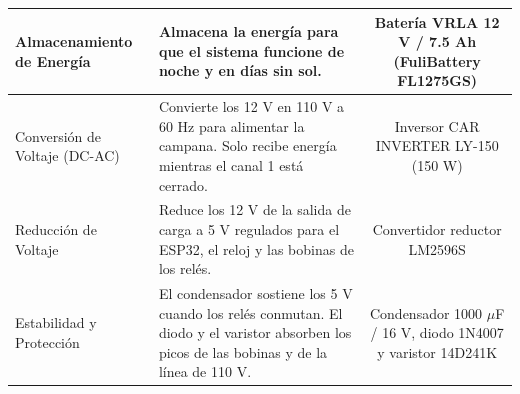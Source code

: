 \documentclass[12pt,letterpaper]{article}
\begin{document}
{\begin{tabular}{|A|B|C|}
\hline
Almacenamiento de Energía & Almacena la energía para que el sistema funcione de noche y en días sin sol. & Batería VRLA 12 V / 7.5 Ah (FuliBattery FL1275GS) \\
\hline
Conversión de Voltaje (DC-AC) & Convierte los 12 V en 110 V a 60 Hz para alimentar la campana. Solo recibe energía mientras el canal 1 está cerrado. & Inversor CAR INVERTER LY-150 (150 W) \\
\hline
Reducción de Voltaje & Reduce los 12 V de la salida de carga a 5 V regulados para el ESP32, el reloj y las bobinas de los relés. & Convertidor reductor LM2596S \\
\hline
Estabilidad y Protección & El condensador sostiene los 5 V cuando los relés conmutan. El diodo y el varistor absorben los picos de las bobinas y de la línea de 110 V. & Condensador 1000 $\mu$F / 16 V, diodo 1N4007 y varistor 14D241K \\
\hline
\end{tabular}}
\end{document}
